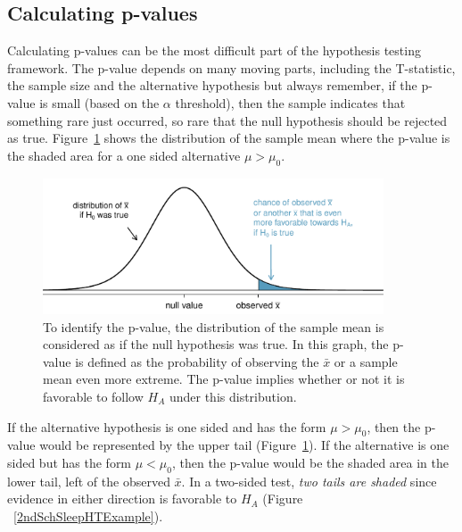 \subsection{Calculating p-values}
\label{pValue}


Calculating p-values can be the most difficult part of the hypothesis testing framework. The p-value depends on many moving parts, including the T-statistic, the sample size and the alternative hypothesis but always remember, if the p-value is small (based on the $\alpha$ threshold), then the sample indicates that something rare just occurred, so rare that the null hypothesis should be rejected as true. Figure~\ref{pValueOneSidedSleepStudyExplained} shows the distribution of the sample mean where the p-value is the shaded area for a one sided alternative $\mu > \mu_0$. 

\begin{figure}[ht]
   \centering
   \includegraphics[width=0.9\textwidth]{ch_inference_foundations_oi_biostat/figures/pValueOneSidedSleepStudyExplained/pValueOneSidedSleepStudyExplained}
   \caption{To identify the p-value, the distribution of the sample mean is considered as if the null hypothesis was true. In this graph, the p-value is defined as the probability of observing the $\bar{x}$ or a sample mean even more extreme. The p-value implies whether or not it is favorable to follow $H_A$ under this distribution.} 
   \label{pValueOneSidedSleepStudyExplained}
\end{figure}

If the alternative hypothesis is one sided and has the form $\mu > \mu_0$, then the p-value would be represented by the upper tail (Figure~\ref{pValueOneSidedSleepStudyExplained}). If the alternative is one sided but has the form $\mu < \mu_0$, then the p-value would be the shaded area in the lower tail, left of the observed $\bar{x}$. In a two-sided test, \emph{two tails are shaded} since evidence in either direction is favorable to $H_A$ (Figure ~\ref{2ndSchSleepHTExample}). 

